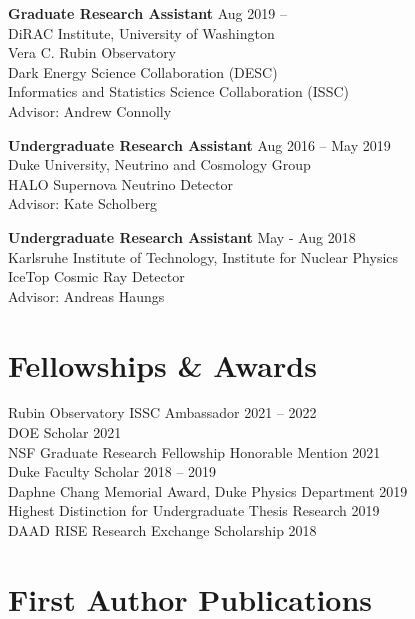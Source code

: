 \documentclass[margin]{res}
\begin{document}
\begin{resume}
\textbf{Graduate Research Assistant} \hfill Aug 2019 -- \\
DiRAC Institute, University of Washington \\
Vera C. Rubin Observatory \\
Dark Energy Science Collaboration (DESC) \\
Informatics and Statistics Science Collaboration (ISSC) \\
Advisor: Andrew Connolly

\textbf{Undergraduate Research Assistant} \hfill Aug 2016 -- May 2019 \\
Duke University, Neutrino and Cosmology Group \\
HALO Supernova Neutrino Detector \\
Advisor: Kate Scholberg 

\textbf{Undergraduate Research Assistant}  \hfill May - Aug 2018 \\
Karlsruhe Institute of Technology, Institute for Nuclear Physics \\
IceTop Cosmic Ray Detector \\
Advisor: Andreas Haungs

\section{Fellowships \& Awards}
Rubin Observatory ISSC Ambassador \hfill 2021 -- 2022 \\
DOE Scholar \hfill 2021 \\
NSF Graduate Research Fellowship Honorable Mention \hfill 2021 \\
Duke Faculty Scholar \hfill 2018 -- 2019 \\
Daphne Chang Memorial Award, Duke Physics Department \hfill 2019 \\
Highest Distinction for Undergraduate Thesis Research \hfill 2019 \\
DAAD RISE Research Exchange Scholarship \hfill 2018 \\

\section{First Author Publications}


\end{resume}
\end{document}
